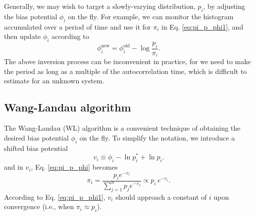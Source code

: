 \documentclass[reprint]{revtex4-1}
\begin{document}
Generally, we may wish to target
a slowly-varying distribution, $p_i$,
by adjusting the bias potential $\phi_i$
on the fly.
%
For example,
we can monitor the histogram accumulated over
a period of time and use it for $\pi_i$ in
Eq. \eqref{eq:pi_p_phi1},
and then update
$\phi_i$ according to
$$
\phi_i^{\mathrm{new}}
=
\phi_i^{\mathrm{old}}
-
\log \frac{ p_i } { \pi_i }.
$$
%
%
The above inversion process can be inconvenient
in practice,
for we need to make the period
as long as a multiple of
the autocorrelation time,
which is difficult to estimate for an unknown system.



\subsection{Wang-Landau algorithm}



The Wang-Landau (WL) algorithm is a convenient technique
of obtaining the desired bias potential $\phi_i$
on the fly.
%
To simplify the notation, we introduce
a shifted bias potential
%
\begin{equation}
  v_i \equiv \phi_i - \ln p^*_i + \ln p_i.
  \label{eq:v_def}
\end{equation}
%
%
and in $v_i$, Eq. \eqref{eq:pi_p_phi}
becomes
%
\begin{equation}
  \pi_i = \frac{ p_i e^{-v_i} }
  { \sum_{j = 1}^n p_j e^{-v_j} }
  \propto p_i \, e^{-v_i}.
  \label{eq:pi_p_v}
\end{equation}
%
According to Eq. \eqref{eq:pi_p_phi1},
$v_i$ should approach a constant of $i$
upon convergence (i.e., when $\pi_i \approx p_i$).
\end{document}
